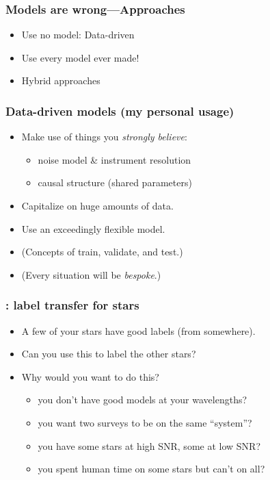 \documentclass[pdftex]{beamer}
\begin{document}
\begin{frame}
  \frametitle{Models are wrong---Approaches}
  \begin{itemize}
  \item Use no model: Data-driven
  \item Use every model ever made!
  \item Hybrid approaches
  \end{itemize}
\end{frame}

\begin{frame}
  \frametitle{Data-driven models (my personal usage)}
  \begin{itemize}
  \item Make use of things you \emph{strongly believe}:
    \begin{itemize}
    \item noise model \& instrument resolution
    \item causal structure (shared parameters)
    \end{itemize}
  \item Capitalize on huge amounts of data.
  \item Use an exceedingly flexible model.
  \item (Concepts of train, validate, and test.)
  \item (Every situation will be \emph{bespoke}.)
  \end{itemize}
\end{frame}

\begin{frame}
  \frametitle{\tc: label transfer for stars}
  \begin{itemize}
  \item A few of your stars have good labels (from somewhere).
  \item Can you use this to label the other stars?
  \item Why would you want to do this?
    \begin{itemize}
    \item<2> you don't have good models at your wavelengths?
    \item<2> you want two surveys to be on the same ``system''?
    \item<2> you have some stars at high SNR, some at low SNR?
    \item<2> you spent human time on some stars but can't on all?
    \end{itemize}
  \end{itemize}
\end{frame}
\end{document}
